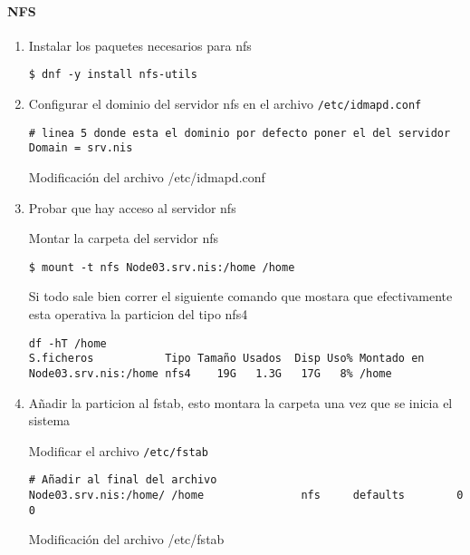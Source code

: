 \documentclass[../main.tex]{subfiles}
\begin{document}
\paragraph{NFS}
\begin{enumerate}
  \item Instalar los paquetes necesarios para \Gls{nfs}
        \begin{listing}[H]
\begin{verbatim}
$ dnf -y install nfs-utils
\end{verbatim}
        \end{listing}
  \item Configurar el dominio del servidor \Gls{nfs} en el
        archivo \texttt{/etc/idmapd.conf}
        \begin{listing}[H]
\begin{verbatim}
# linea 5 donde esta el dominio por defecto poner el del servidor
Domain = srv.nis
\end{verbatim}
          \label{list:idmap}
          \caption{Modificación del archivo /etc/idmapd.conf}
        \end{listing}

  \item Probar que hay acceso al servidor \Gls{nfs}

        Montar la carpeta del servidor \Gls{nfs}
        \begin{listing}[H]
\begin{verbatim}
$ mount -t nfs Node03.srv.nis:/home /home
\end{verbatim}
        \end{listing}

        Si todo sale bien correr el siguiente comando que mostara que
        efectivamente esta operativa la particion del tipo \Gls{nfs}4
        \begin{listing}[H]
\begin{verbatim}
df -hT /home
S.ficheros           Tipo Tamaño Usados  Disp Uso% Montado en
Node03.srv.nis:/home nfs4    19G   1.3G   17G   8% /home
\end{verbatim}
        \end{listing}

  \item Añadir la particion al \Gls{fstab}, esto montara la carpeta una vez
        que se inicia el sistema

        Modificar el archivo \texttt{/etc/fstab}
        \begin{listing}[H]
\begin{verbatim}
# Añadir al final del archivo
Node03.srv.nis:/home/ /home               nfs     defaults        0 0
\end{verbatim}
          \label{list:fstab}
          \caption{Modificación del archivo /etc/fstab}
        \end{listing}


\end{enumerate}
\end{document}
